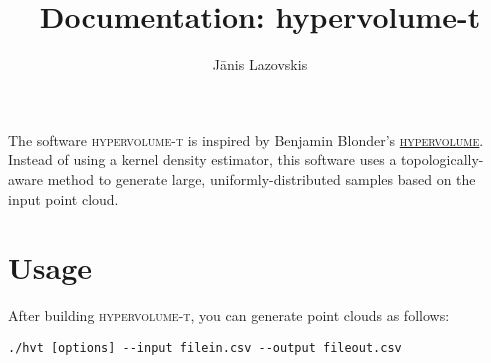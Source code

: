 \documentclass[a4paper]{amsart}
\begin{document}
\title{Documentation: hypervolume-t}

\author{Jānis Lazovskis}
\address{Riga Technical University, Riga, Latvia}

\maketitle

\noindent
The software \textsc{hypervolume-t} is inspired by Benjamin Blonder's
\href{https://github.com/bblonder/hypervolume}{\textsc{hypervolume}}. Instead of using a kernel density estimator, this software uses a topologically-aware method to generate large, uniformly-distributed samples based on the input point cloud.

\section{Usage}
\noindent
After building \textsc{hypervolume-t}, you can generate point clouds as follows:

\vspace{1em}

\begin{verbatim}./hvt [options] --input filein.csv --output fileout.csv\end{verbatim}

\vspace{1em}

\vfill
\end{document}
